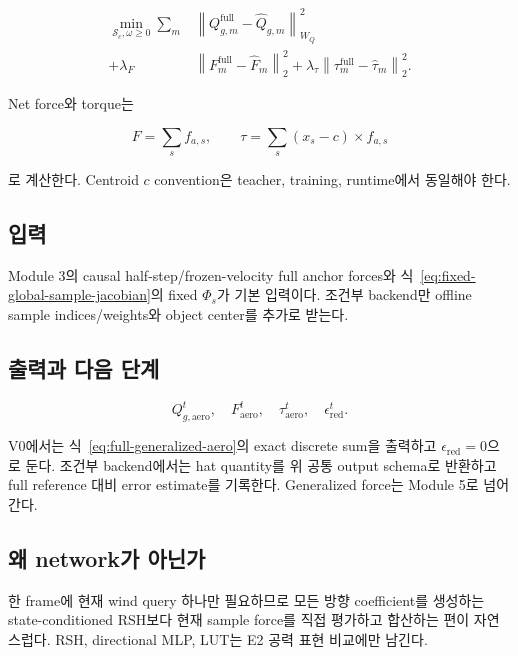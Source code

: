 \documentclass[11pt,a4paper]{article}
\begin{document}
\begin{equation}
\begin{aligned}
  \min_{\mathcal S_c,\omega\ge0}
  \sum_m
  &\left\|
  Q_{g,m}^{\mathrm{full}}
  -\widehat Q_{g,m}
  \right\|_{W_Q}^2\\
  +\lambda_F&
  \left\|
  F_m^{\mathrm{full}}
  -\widehat F_m
  \right\|_2^2
  +\lambda_\tau
  \left\|
  \tau_m^{\mathrm{full}}
  -\widehat\tau_m
  \right\|_2^2.
  \label{eq:cubature-fit}
\end{aligned}
\end{equation}

Net force와 torque는

\begin{equation}
  F=\sum_s f_{a,s},
  \qquad
  \tau=\sum_s(x_s-c)\times f_{a,s}
\end{equation}

로 계산한다.
Centroid \(c\) convention은 teacher, training, runtime에서 동일해야 한다.

\subsection*{입력}

Module 3의 causal half-step/frozen-velocity full anchor forces와
식~\eqref{eq:fixed-global-sample-jacobian}의 fixed \(\Phi_s\)가 기본 입력이다.
조건부 backend만 offline sample indices/weights와 object center를 추가로 받는다.

\subsection*{출력과 다음 단계}

\begin{equation}
  Q_{g,\mathrm{aero}}^t,\quad
  F_{\mathrm{aero}}^t,\quad
  \tau_{\mathrm{aero}}^t,\quad
  \epsilon_{\mathrm{red}}^t.
\end{equation}

V0에서는 식~\eqref{eq:full-generalized-aero}의 exact discrete sum을 출력하고
\(\epsilon_{\mathrm{red}}=0\)으로 둔다.
조건부 backend에서는 hat quantity를 위 공통 output schema로 반환하고 full reference 대비 error estimate를 기록한다.
Generalized force는 Module 5로 넘어간다.

\subsection*{왜 network가 아닌가}

한 frame에 현재 wind query 하나만 필요하므로
모든 방향 coefficient를 생성하는 state-conditioned RSH보다
현재 sample force를 직접 평가하고 합산하는 편이 자연스럽다.
RSH, directional MLP, LUT는 E2 공력 표현 비교에만 남긴다.
\end{document}
